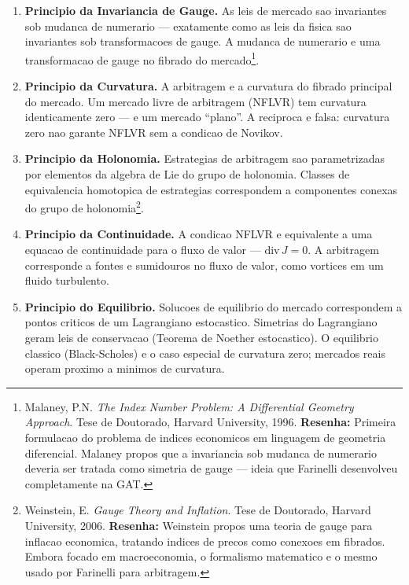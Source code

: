 \documentclass[12pt,a4paper]{article}
\theoremstyle{remark}
\begin{document}
\begin{enumerate}[nosep]

  \item \textbf{Principio da Invariancia de Gauge.} As leis de mercado sao
        invariantes sob mudanca de numerario — exatamente como as leis da fisica
        sao invariantes sob transformacoes de gauge. A mudanca de numerario e
        uma transformacao de gauge no fibrado do mercado\footnote{Malaney, P.N.
        \textit{The Index Number Problem: A Differential Geometry Approach}.
        Tese de Doutorado, Harvard University, 1996. \textbf{Resenha:} Primeira
        formulacao do problema de indices economicos em linguagem de geometria
        diferencial. Malaney propos que a invariancia sob mudanca de numerario
        deveria ser tratada como simetria de gauge — ideia que Farinelli
        desenvolveu completamente na GAT.}.

  \item \textbf{Principio da Curvatura.} A arbitragem e a curvatura do fibrado
        principal do mercado. Um mercado livre de arbitragem (NFLVR) tem
        curvatura identicamente zero — e um mercado ``plano''. A reciproca e
        falsa: curvatura zero nao garante NFLVR sem a condicao de Novikov.

  \item \textbf{Principio da Holonomia.} Estrategias de arbitragem sao
        parametrizadas por elementos da algebra de Lie do grupo de holonomia.
        Classes de equivalencia homotopica de estrategias correspondem a
        componentes conexas do grupo de holonomia\footnote{Weinstein, E.
        \textit{Gauge Theory and Inflation}. Tese de Doutorado, Harvard
        University, 2006. \textbf{Resenha:} Weinstein propos uma teoria de gauge
        para inflacao economica, tratando indices de precos como conexoes em
        fibrados. Embora focado em macroeconomia, o formalismo matematico e o
        mesmo usado por Farinelli para arbitragem.}.

  \item \textbf{Principio da Continuidade.} A condicao NFLVR e equivalente a
        uma equacao de continuidade para o fluxo de valor — $\text{div}\,J = 0$.
        A arbitragem corresponde a fontes e sumidouros no fluxo de valor, como
        vortices em um fluido turbulento.

  \item \textbf{Principio do Equilibrio.} Solucoes de equilibrio do mercado
        correspondem a pontos criticos de um Lagrangiano estocastico. Simetrias
        do Lagrangiano geram leis de conservacao (Teorema de Noether estocastico).
        O equilibrio classico (Black-Scholes) e o caso especial de curvatura zero;
        mercados reais operam proximo a minimos de curvatura.

\end{enumerate}
\end{document}
